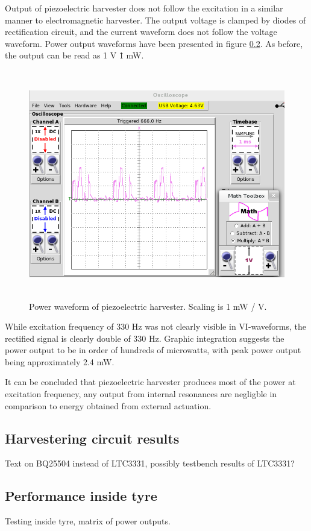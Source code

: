 Output of piezoelectric harvester does not follow the excitation in a similar manner to electromagnetic harvester. The output voltage is clamped by diodes of rectification circuit, and the current waveform does not follow the voltage waveform. Power output waveforms have been presented in figure \ref{}. As before, the output can be read as 1 V \= 1 mW. 

\begin{figure}[htb]
\begin{center}
\includegraphics[height=10cm]{images/own_measurement/generator_shaker/piezo_td_power_330hz_2_3.png}
\end{center}
\caption{\label{fig:piezo_td_vi} Power waveform of piezoelectric harvester. Scaling is 1 mW / V.}
\end{figure}

While excitation frequency of 330 Hz was not clearly visible in VI-waveforms, the rectified signal is clearly double of 330 Hz. Graphic integration suggests the power output to be in order of hundreds of microwatts, with peak power output being approximately 2.4 mW. 

It can be concluded that piezoelectric harvester produces most of the power at excitation frequency, any output from internal resonances are negligble in comparison to energy obtained from external actuation.

\subsection{Harvestering circuit results }
Text on BQ25504 instead of LTC3331, possibly testbench results of LTC3331?

\subsection{Performance inside tyre}
Testing inside tyre, matrix of power outputs. 

